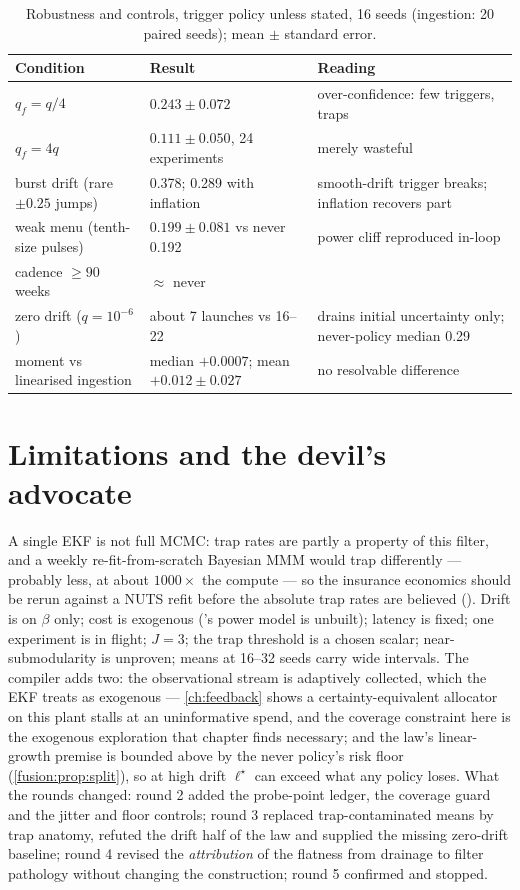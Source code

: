 \begin{table}[htbp]
\centering\small
\caption{Robustness and controls, trigger policy unless stated, 16 seeds (ingestion: 20 paired seeds); mean $\pm$ standard error.}
\label{fusion:tab:controls}
\begin{tabularx}{\textwidth}{lXX}
\toprule
Condition & Result & Reading \\
\midrule
$q_f = q/4$ & $0.243 \pm 0.072$ & over-confidence: few triggers, traps \\
$q_f = 4q$ & $0.111 \pm 0.050$, 24 experiments & merely wasteful \\
burst drift (rare $\pm 0.25$ jumps) & 0.378; 0.289 with inflation & smooth-drift trigger breaks; inflation recovers part \\
weak menu (tenth-size pulses) & $0.199 \pm 0.081$ vs never 0.192 & power cliff reproduced in-loop \\
cadence $\ge 90$ weeks & $\approx$ never & \\
zero drift ($q = 10^{-6}$) & about 7 launches vs 16--22 & drains initial uncertainty only; never-policy median 0.29 \\
moment vs linearised ingestion & median $+0.0007$; mean $+0.012 \pm 0.027$ & no resolvable difference \\
\bottomrule
\end{tabularx}
\end{table}

\section{Limitations and the devil's advocate}

A single EKF is not full MCMC: trap rates are partly a property of this filter, and a weekly re-fit-from-scratch Bayesian MMM would trap differently --- probably less, at about $1000\times$ the compute --- so the insurance economics should be rerun against a NUTS refit before the absolute trap rates are believed (). Drift is on $\beta$ only; cost is exogenous ('s power model is unbuilt); latency is fixed; one experiment is in flight; $J = 3$; the trap threshold is a chosen scalar; near-submodularity is unproven; means at 16--32 seeds carry wide intervals. The compiler adds two: the observational stream is adaptively collected, which the EKF treats as exogenous --- \cref{ch:feedback} shows a certainty-equivalent allocator on this plant stalls at an uninformative spend, and the coverage constraint here is the exogenous exploration that chapter finds necessary; and the law's linear-growth premise is bounded above by the never policy's risk floor (\cref{fusion:prop:split}), so at high drift $\ell^\star$ can exceed what any policy loses. What the rounds changed: round 2 added the probe-point ledger, the coverage guard and the jitter and floor controls; round 3 replaced trap-contaminated means by trap anatomy, refuted the drift half of the law and supplied the missing zero-drift baseline; round 4 revised the \emph{attribution} of the flatness from drainage to filter pathology without changing the construction; round 5 confirmed and stopped.

